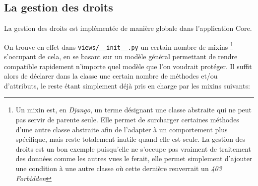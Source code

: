 \documentclass[a4paper]{report}
\begin{document}
\subsection{La gestion des droits}
\label{sub:la_gestion_des_droits}
\par La gestion des droits est implémentée de manière globale dans l'application Core.
\par On trouve en effet dans \verb#views/__init__.py# un certain nombre de mixins \footnote{Un mixin est, en
\emph{Django}, un terme désignant une classe abstraite qui ne peut pas servir de parente seule. Elle permet de
surcharger certaines méthodes d'une autre classe abstraite afin de l'adapter à un comportement plus spécifique, mais
reste totalement inutile quand elle est seule. La gestion des droits est un bon exemple puisqu'elle ne s'occupe pas
vraiment de traitement des données comme les autres vues le ferait, elle permet simplement d'ajouter une condition à une
autre classe où cette dernière renverrait un \emph{403 Forbidden} }  s'occupant de cela, en se basant sur
un modèle général permettant de rendre compatible rapidement n'importe quel modèle que l'on voudrait protéger. Il suffit
alors de déclarer dans la classe une certain nombre de méthodes et/ou d'attributs, le reste étant simplement déjà pris
en charge par les mixins suivants:
\end{document}
